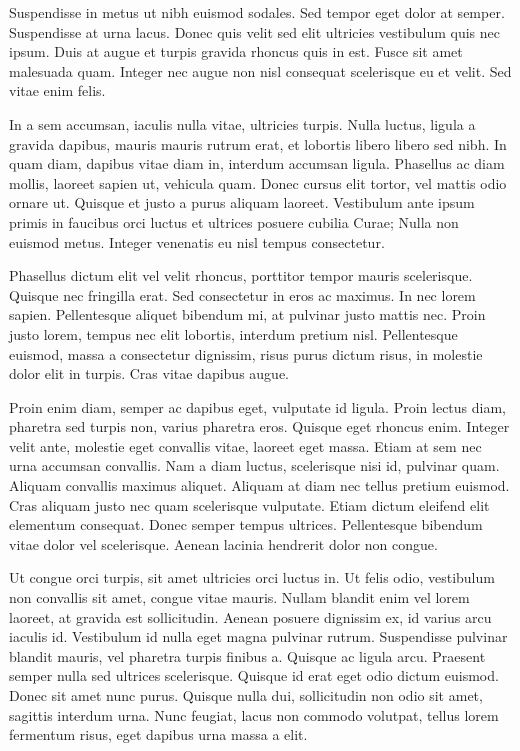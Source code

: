 Suspendisse in metus ut nibh euismod sodales. Sed tempor eget dolor at semper. Suspendisse at urna lacus. Donec quis velit sed elit ultricies vestibulum quis nec ipsum. Duis at augue et turpis gravida rhoncus quis in est. Fusce sit amet malesuada quam. Integer nec augue non nisl consequat scelerisque eu et velit. Sed vitae enim felis.

In a sem accumsan, iaculis nulla vitae, ultricies turpis. Nulla luctus, ligula a gravida dapibus, mauris mauris rutrum erat, et lobortis libero libero sed nibh. In quam diam, dapibus vitae diam in, interdum accumsan ligula. Phasellus ac diam mollis, laoreet sapien ut, vehicula quam. Donec cursus elit tortor, vel mattis odio ornare ut. Quisque et justo a purus aliquam laoreet. Vestibulum ante ipsum primis in faucibus orci luctus et ultrices posuere cubilia Curae; Nulla non euismod metus. Integer venenatis eu nisl tempus consectetur.

Phasellus dictum elit vel velit rhoncus, porttitor tempor mauris scelerisque. Quisque nec fringilla erat. Sed consectetur in eros ac maximus. In nec lorem sapien. Pellentesque aliquet bibendum mi, at pulvinar justo mattis nec. Proin justo lorem, tempus nec elit lobortis, interdum pretium nisl. Pellentesque euismod, massa a consectetur dignissim, risus purus dictum risus, in molestie dolor elit in turpis. Cras vitae dapibus augue.

Proin enim diam, semper ac dapibus eget, vulputate id ligula. Proin lectus diam, pharetra sed turpis non, varius pharetra eros. Quisque eget rhoncus enim. Integer velit ante, molestie eget convallis vitae, laoreet eget massa. Etiam at sem nec urna accumsan convallis. Nam a diam luctus, scelerisque nisi id, pulvinar quam. Aliquam convallis maximus aliquet. Aliquam at diam nec tellus pretium euismod. Cras aliquam justo nec quam scelerisque vulputate. Etiam dictum eleifend elit elementum consequat. Donec semper tempus ultrices. Pellentesque bibendum vitae dolor vel scelerisque. Aenean lacinia hendrerit dolor non congue.

Ut congue orci turpis, sit amet ultricies orci luctus in. Ut felis odio, vestibulum non convallis sit amet, congue vitae mauris. Nullam blandit enim vel lorem laoreet, at gravida est sollicitudin. Aenean posuere dignissim ex, id varius arcu iaculis id. Vestibulum id nulla eget magna pulvinar rutrum. Suspendisse pulvinar blandit mauris, vel pharetra turpis finibus a. Quisque ac ligula arcu. Praesent semper nulla sed ultrices scelerisque. Quisque id erat eget odio dictum euismod. Donec sit amet nunc purus. Quisque nulla dui, sollicitudin non odio sit amet, sagittis interdum urna. Nunc feugiat, lacus non commodo volutpat, tellus lorem fermentum risus, eget dapibus urna massa a elit.

